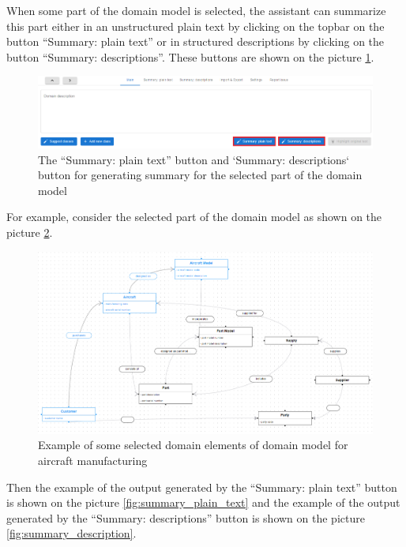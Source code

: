 When some part of the domain model is selected, the assistant can summarize this part either in an unstructured plain text by clicking on the topbar on the button ``Summary: plain text'' or in structured descriptions by clicking on the button ``Summary: descriptions''. These buttons are shown on the picture \ref{fig:summary_buttons}.

\begin{figure}[!h]
    \includegraphics[scale=0.35]{../docs/images/frontend/summary-buttons.png}
    \caption{\centering The ``Summary: plain text'' button and `Summary: descriptions` button for generating summary for the selected part of the domain model}
    \label{fig:summary_buttons}
\end{figure}

For example, consider the selected part of the domain model as shown on the picture \ref{fig:selection_aircraft}.

\begin{figure}[!h]
    \includegraphics[scale=0.38]{../docs/images/frontend/selection-aircraft.png}
    \caption{\centering Example of some selected domain elements of domain model for aircraft manufacturing}
    \label{fig:selection_aircraft}
\end{figure}

Then the example of the output generated by the ``Summary: plain text'' button is shown on the picture \ref{fig:summary_plain_text} and the example of the output generated by the ``Summary: descriptions'' button is shown on the picture \ref{fig:summary_description}.

